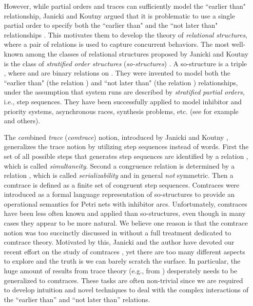\documentclass{llncs}
\begin{document}
However, while partial orders and traces can sufficiently model the ``earlier than" relationship, Janicki and Koutny argued that it is problematic to use a single partial order to specify both  the ``earlier than" and  the ``not later than" relationships \cite{J4}. This motivates them to develop the theory of \emph{relational structures}, where a pair of relations is used to capture concurrent behaviors.  The most well-known among the classes of relational structures  proposed by Janicki and Koutny is the class of \emph{stratified order structures} (\emph{so-structures}) \cite{GP,JK0,JK95,JK97,J0}. A so-structure is a triple , where  and  are binary relations on . They were invented to model both the ``earlier than" (the relation ) and ``not later than" (the relation ) relationships, under the assumption that system runs are described by \emph{stratified partial orders}, i.e., step sequences. They have been successfully applied to model inhibitor and priority systems, asynchronous races, synthesis problems, etc. (see for example \cite{JK95,JK99,JLM06,JLM08,KK,KK08} and others). 

The \emph{com}bined \emph{trace} (\emph{comtrace}) notion, introduced by Janicki and Koutny \cite{JK95}, generalizes the trace notion by utilizing step sequences instead of words. First the set of all possible steps that generates step sequences are identified by a relation , which is called {\em simultaneity}. Second a congruence relation is determined by a relation , which is called {\em serializability} and in general \emph{not} symmetric. Then a comtrace is defined as a finite set of congruent step sequences. Comtraces were introduced as a formal language representation of so-structures to provide an operational semantics for  Petri nets with inhibitor arcs. Unfortunately, comtraces have been less often known and applied than so-structures, even though in many cases they appear to be more natural. We believe one  reason is that the comtrace notion was too succinctly discussed in \cite{JK95} without a full treatment dedicated to comtrace theory. Motivated by this, Janicki and the author have devoted our recent effort on the study of comtraces \cite{JL08,Le,JL09}, yet there are too many different aspects to explore and the truth is we can barely scratch the surface. In particular, the huge amount of results from  trace theory (e.g., from \cite{DR,DM}) desperately needs to be generalized to comtraces. These  tasks are often non-trivial since we are required to develop intuition and novel techniques to deal with the complex interactions of the ``earlier than'' and ``not later than'' relations.
\end{document}
